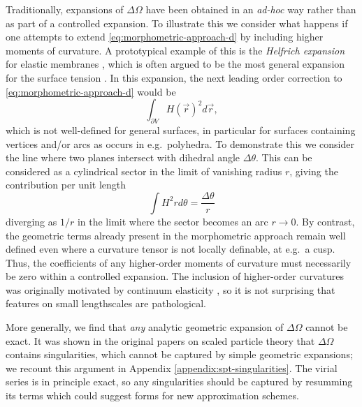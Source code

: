 \documentclass[11pt,twoside]{report}
\begin{document}
Traditionally, expansions of $\Delta \Omega$ have been obtained in an \emph{ad-hoc} way rather than as part of a controlled expansion.
To illustrate this we consider what happens if one attempts to extend \eqref{eq:morphometric-approach-d} by including higher moments of curvature.
A prototypical example of this is the \emph{Helfrich expansion} for elastic membranes \cite{HelfrichZFNC1973}, which is often argued to be the most general expansion for the surface tension \cite{BlokhuisPRE2013}.
In this expansion, the next leading order correction to \eqref{eq:morphometric-approach-d} would be%
\begin{equation*}
  \int_{\partial V} H(\vec{r})^2 d\vec{r},
\end{equation*}
which is not well-defined for general surfaces, in particular for surfaces containing vertices and/or arcs as occurs in e.g.\ polyhedra.
To demonstrate this we consider the line where two planes intersect with dihedral angle $\Delta \theta$.
This can be considered as a cylindrical sector in the limit of vanishing radius $r$, giving the contribution per unit length
\begin{equation*}
  \int H^2 r d\theta
  = \frac{\Delta \theta}{r}
\end{equation*}
diverging as $1 / r$ in the limit where the sector becomes an arc $r \to 0$.
By contrast, the geometric terms already present in the morphometric approach remain well defined even where a curvature tensor is not locally definable, at e.g.\ a cusp.
Thus, the coefficients of any higher-order moments of curvature must necessarily be zero within a controlled expansion.
The inclusion of higher-order curvatures was originally motivated by continuum elasticity \cite{HelfrichZFNC1973}, so it is not surprising that features on small lengthscales are pathological.

More generally, we find that \emph{any} analytic geometric expansion of $\Delta \Omega$ cannot be exact.
It was shown in the original papers on scaled particle theory \cite{ReissJCP1959,ReissJCP1960} that $\Delta \Omega$ contains singularities, which cannot be captured by simple geometric expansions; we recount this argument in Appendix \ref{appendix:spt-singularities}.
The virial series is in principle exact, so any singularities should be captured by resumming its terms which could suggest forms for new approximation schemes.
\end{document}
